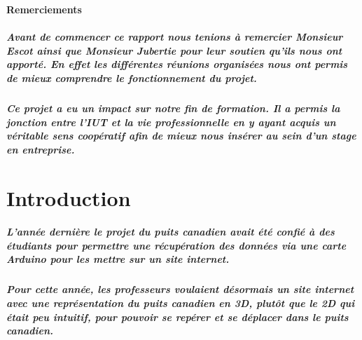 \documentclass[12pt , a4paper,titlepage]{report}
\begin{document}


\maketitle

\begin{center}

\bf \huge \bigskip \bigskip Remerciements 
\end{center}

 \bigskip \bigskip \bigskip \bigskip \bigskip  \bigskip \bigskip 
\paragraph{Avant de commencer ce rapport nous tenions à remercier Monsieur Escot ainsi
 que Monsieur Jubertie pour leur soutien qu'ils nous ont apporté. En effet les différentes réunions organisées nous ont
  permis de mieux comprendre le fonctionnement du projet.}
\paragraph {Ce projet a eu un impact sur notre fin de formation. Il a permis la jonction entre l'IUT et la vie professionnelle en y
 ayant acquis un véritable sens coopératif afin de mieux nous insérer au sein d'un stage en entreprise.}


\tableofcontents



 \chapter{Introduction}
 \paragraph{   L'année dernière le projet du puits canadien avait été confié à des étudiants pour permettre une récupération des données
 via une carte Arduino pour les mettre sur un site internet. }
 \paragraph{   Pour cette année, les professeurs voulaient désormais un site internet avec une représentation du puits canadien en 3D, 
 plutôt que le 2D qui était peu intuitif, pour pouvoir se repérer et se déplacer dans le puits canadien.}
\end{document}
